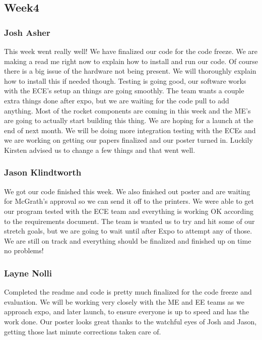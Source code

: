 \documentclass[10pt,draftclsnofoot,onecolumn]{IEEEtran}
\begin{document}
\subsection{Week4}
\subsubsection{Josh Asher}
This week went really well! We have finalized our code for the code freeze. We are making a read me right now to explain how to install and run our code. Of course there is a big issue of the hardware not being present. We will thoroughly explain how to install this if needed though. Testing is going good, our software works with the ECE's setup an things are going smoothly. The team wants a couple extra things done after expo, but we are waiting for the code pull to add anything. Most of the rocket components are coming in this week and the ME's are going to actually start building this thing. We are hoping for a launch at the end of next month. We will be doing more integration testing with the ECEs and we are working on getting our papers finalized and our poster turned in. Luckily Kirsten advised us to change a few things and that went well. \par

\subsubsection{Jason Klindtworth}
We got our code finished this week. We also finished out poster and are waiting for McGrath's approval so we can send it off to the printers. We were able to get our program tested with the ECE team and everything is working OK according to the requirements document. The team is wanted us to try and hit some of our stretch goals, but we are going to wait until after Expo to attempt any of those. We are still on track and everything should be finalized and finished up on time no problems! \par

\subsubsection{Layne Nolli}
Completed the readme and code is pretty much finalized for the code freeze and evaluation. We will be working very closely with the ME and EE teams as we approach expo, and later launch, to ensure everyone is up to speed and has the work done. Our poster looks great thanks to the watchful eyes of Josh and Jason, getting those last minute corrections taken care of. \par
\end{document}
